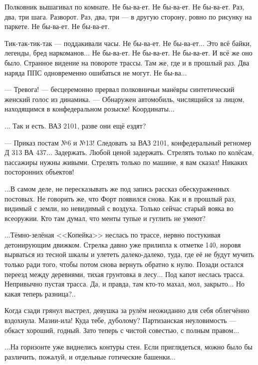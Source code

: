 Полковник вышагивал по комнате. Не бы-ва-ет. Не бы-ва-ет. Не бы-ва-ет.
Раз, два, три шага. Разворот. Раз, два, три --- в другую сторону, ровно по рисунку на паркете. Не бы-ва-ет. Не бы-ва-ет.

Тик-так-тик-так --- поддакивали часы. Не бы-ва-ет. Не бы-ва-ет... Это всё байки, легенды, бред наркоманов...
Не бы-ва-ет. Не бы-ва-ет. Не бы-ва-ет. И всё же оно было.
Странное видение на повороте трассы. Там же, где и в прошлый раз.
Два наряда ППС одновременно ошибаться не могут. Не бы-ва...

--- Тревога! --- бесцеремонно прервал полковничьи манёвры синтетический женский голос из динамика.
--- Обнаружен автомобиль, числящийся за лицом, находящимся в конфедеральном розыске! Координаты...

... Так и есть. ВАЗ 2101, разве они ещё ездят?

--- Приказ постам №6 и №13! Следовать за ВАЗ 2101, конфедеральный регномер Д 313 ВА 437...
Задержать. Любой ценой задержать. Стрелять только по колёсам, пассажиры нужны живыми.
Стрелять только по машине, я вам сказал! Никаких посторонних объектов!

...В самом деле, не пересказывать же под запись рассказ обескураженных постовых. Не говорить же, что Форт появился снова.
Как и в прошлый раз, видимый с земли, но невидимый с воздуха. Только сейчас старый вояка во всеоружии.
Кто там думал, что менты тупые и гуглить не умеют?

\emptypar

...Тёмно-зелёная <<Копейка>> неслась по трассе, нервно постукивая детонирующим движком.
Стрелка давно уже прилипла к отметке 140, норовя вырваться из тесной шкалы и улететь далеко-далеко,
туда, где её не будут мучить только ради того, чтобы потом снова вернуть обратно к нулю.
Позади остался переезд между деревнями, тихая грунтовка в лесу...
Под капот неслась трасса. Непривычно пустая трасса. Да, и правда, там кто-то махал, мол, закрыто...
Но какая теперь разница?..

\emptypar

Когда сзади грянул выстрел, девушка за рулём неожиданно для себя облегчённо вздохнула. Мазии-ила! Куда тебе, дуболому?
Партизанская неуловимость --- обкаст хороший, годный. Зато теперь с чистой совестью, с полным правом...

\emptypar

...На горизонте уже виднелись контуры стен.
Если приглядеться, можно было бы различить, пожалуй, и отдельные готические башенки...

